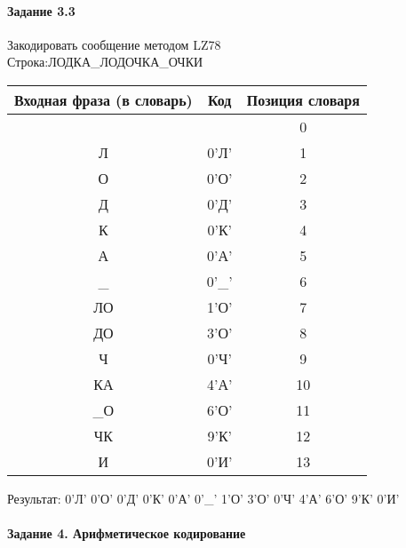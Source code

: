 \documentclass[a4paper, 12pt]{article}
\begin{document}
\paragraph{Задание 3.3}

Закодировать сообщение методом LZ78\\
Строка:ЛОДКА\_ЛОДОЧКА\_ОЧКИ\\
\begin{table}[h!]
\centering
\begin{tabular}{|c|c|c|} 
\hline
 Входная фраза (в словарь) & Код & Позиция словаря \\ \hline

 &  & 0 \\ \hline
Л & 0'Л' & 1 \\ \hline
О & 0'О' & 2 \\ \hline
Д & 0'Д' & 3 \\ \hline
К & 0'К' & 4 \\ \hline
А & 0'А' & 5 \\ \hline
\_ & 0'\_' & 6 \\ \hline
ЛО & 1'О' & 7 \\ \hline
ДО & 3'О' & 8 \\ \hline
Ч & 0'Ч' & 9 \\ \hline
КА & 4'А' & 10 \\ \hline
\_О & 6'О' & 11 \\ \hline
ЧК & 9'К' & 12 \\ \hline
И & 0'И' & 13 \\ \hline
\end{tabular}
\end{table}

Результат: 0'Л' 0'О' 0'Д' 0'К' 0'А' 0'\_' 1'О' 3'О' 0'Ч' 4'А' 6'О' 9'К' 0'И'\\
\pagebreak
\paragraph{Задание 4. Арифметическое кодирование\\}
\end{document}
